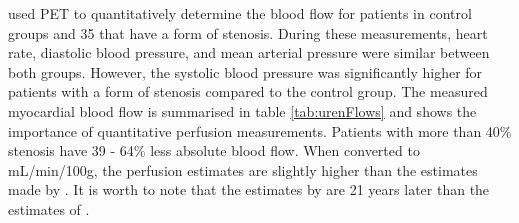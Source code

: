 \cite{uren1994relation} used \ac{PET} to quantitatively determine the blood flow for patients in control groups and 35 that have a form of stenosis. During these measurements, heart rate, diastolic blood pressure, and mean arterial pressure were similar between both groups. However, the systolic blood pressure was significantly higher for patients with a form of stenosis compared to the control group. The measured myocardial blood flow is summarised in table \ref{tab:urenFlows} and shows the importance of quantitative perfusion measurements. Patients with more than 40\% stenosis have 39 - 64\% less absolute blood flow. When converted to mL/min/100g, the perfusion estimates are slightly higher than the estimates made by \cite{slart2015Pres}. It is worth to note that the estimates by \cite{slart2015Pres} are 21 years later than the estimates of \cite{uren1994relation}.


